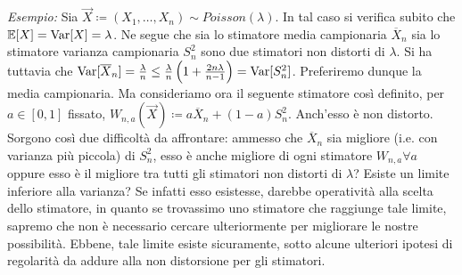 \textit{Esempio:} Sia $\vec{X}\coloneqq (X_1,\ldots,X_n)\sim Poisson(\lambda)$. In tal caso si verifica subito che $\mathbb{E}[X]=\operatorname{Var}[X]=\lambda$. Ne segue che sia lo stimatore media campionaria $\overline{X}_n$ sia lo stimatore varianza campionaria $S_n^2$ sono due stimatori non distorti di $\lambda$. Si ha tuttavia che $\operatorname{Var}[\overline{X}_n]=\frac{\lambda}{n}\leq\frac{\lambda}{n}\left(1+\frac{2n\lambda}{n-1}\right)=\operatorname{Var}[S_n^2]$. Preferiremo dunque la media campionaria. Ma consideriamo ora il seguente stimatore così definito, per $a\in [0,1]$ fissato, $W_{n,a}(\vec{X})\coloneqq a\overline{X}_n +(1-a)S_n^2$. Anch'esso è non distorto. Sorgono così due difficoltà da affrontare: ammesso che $\overline{X}_n$ sia migliore (i.e. con varianza più piccola) di $S_n^2$, esso è anche migliore di ogni stimatore $W_{n,a} \forall a$ oppure esso è il migliore tra tutti gli stimatori non distorti di $\lambda$? Esiste un limite inferiore alla varianza? Se infatti esso esistesse, darebbe operatività alla scelta dello stimatore, in quanto se trovassimo uno stimatore che raggiunge tale limite, sapremo che non è necessario cercare ulteriormente per migliorare le nostre possibilità. Ebbene, tale limite esiste sicuramente, sotto alcune ulteriori ipotesi di regolarità da addure alla non distorsione per gli stimatori.
\\
\\
